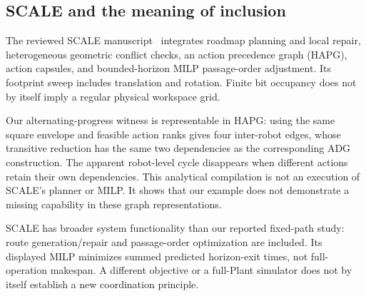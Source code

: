 \documentclass[11pt,a4paper]{article}
\theoremstyle{remark}
\begin{document}
\subsection{SCALE and the meaning of inclusion}
The reviewed SCALE manuscript~\cite{scale2026} integrates roadmap planning
and local repair, heterogeneous geometric conflict checks, an action
precedence graph (HAPG), action capsules, and bounded-horizon MILP passage-order
adjustment. Its footprint sweep includes translation and rotation. Finite
bit occupancy does not by itself imply a regular physical workspace grid.

Our alternating-progress witness is representable in HAPG: using the same
square envelope and feasible action ranks gives four inter-robot edges,
whose transitive reduction has the same two dependencies as the corresponding
ADG construction. The apparent robot-level cycle disappears when different
actions retain their own dependencies. This analytical compilation is not
an execution of SCALE's planner or MILP. It shows that our example does not
demonstrate a missing capability in these graph representations.

SCALE has broader system functionality than our reported fixed-path study:
route generation/repair and passage-order optimization are included.
Its displayed MILP minimizes summed predicted horizon-exit times, not
full-operation makespan. A different objective or a full-Plant simulator
does not by itself establish a new coordination principle.
\end{document}
